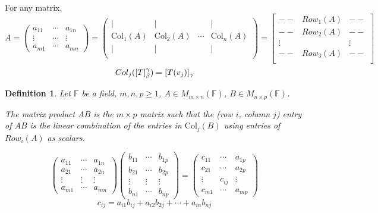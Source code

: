 \documentclass[12pt]{article}
\theoremstyle{plain}
\newtheorem{definition}{Definition}[subsection]
\newcommand{\Col}{\mathrm{Col}}
\newcommand{\mF}{{\mathbb{F}}}
\begin{document}
	For any matrix, 
	\[
		A =
		\begin{pmatrix}
			a_{11} & \cdots & a_{1n}\\
			\vdots & \cdots & \vdots \\ 
			a_{m1} & \cdots & a_{mn}
		\end{pmatrix}
		= 
		\begin{pmatrix}
			| & | & & | \\
			\Col_1(A) & \Col_2(A) & \cdots & \Col_n(A)\\
			| & | & & | \\
		\end{pmatrix}
		= 
		\begin{bmatrix}
			-- & Row_1(A) & --\\
			-- & Row_2(A) & --\\
			\vdots & & \vdots\\
			-- & Row_3(A) & --\\
		\end{bmatrix}
	\]
	\[
		Col_j([T]_{\beta}^{\gamma}) = [T(v_j)]_{\gamma}\\
	\]
	
	\begin{definition}
		Let $\mF$ be a field, $m,n,p \geq1$, $A\in M_{m\times n}(\mF)$, 
		$B\in M_{n\times p} (\mF)$.

		
		The matrix product $AB$ is the $m \times p$ matrix such that the 
		(row $i$, column $j$) entry of $AB$ is the linear combination of the 
		entries in $\Col_j(B)$ using entries of $Row_i(A)$ as scalars. 
	\end{definition}

	\[
		\begin{pmatrix}
			a_{11} & \cdots & a_{1n}\\
			a_{21} & \cdots & a_{2n} \\
			\vdots & \vdots & \vdots \\
			a_{m1} & \cdots & a_{mn}
		\end{pmatrix}
		\begin{pmatrix}
			b_{11} & \cdots & b_{1p}\\
			b_{21} & \cdots & b_{2p} \\
			\vdots & \vdots & \vdots \\
			b_{n1} & \cdots & b_{np}
		\end{pmatrix}
		=
		\begin{pmatrix}
			c_{11} & \cdots & a_{1p} \\
			c_{21} & \cdots & a_{2p} \\
			\vdots & c_{ij} & \vdots \\
			c_{m1} & \cdots & a_{mp} 
		\end{pmatrix}
	\]
	\[
		c_{ij} = a_{i1}b_{ij}+a_{i2}b_{2j}+\cdots+a_{in}b_{nj}
	\]
\end{document}
